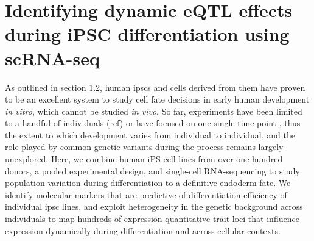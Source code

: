 
\chapter{Identifying dynamic eQTL effects during iPSC differentiation using scRNA-seq}

As outlined in section 1.2, human \gls{ipsc}s and cells derived from them have proven to be an excellent system to study cell fate decisions in early human development \textit{in vitro}, which cannot be studied \textit{in vivo}.
So far, experiments have been limited to a handful of individuals (ref) or have focused on one single time point \cite{kilpinen2017common, schwartzentruber2018molecular}, thus the extent to which development varies from individual to individual, and the role played by common genetic variants during the process remains largely unexplored.
Here, we combine human iPS cell lines from over one hundred donors, a pooled experimental design, and single-cell RNA-sequencing to study population variation during differentiation to a definitive endoderm fate. 
We identify molecular markers that are predictive of differentiation efficiency of individual \gls{ipsc} lines, and exploit heterogeneity in the genetic background across individuals to map hundreds of expression quantitative trait loci that influence expression dynamically during differentiation and across cellular contexts.\\

\newpage

